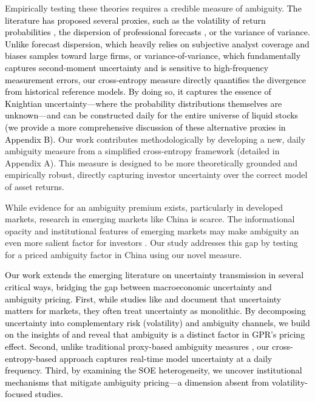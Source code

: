 \documentclass[preprint,12pt,authoryear]{elsarticle}
\begin{document}
Empirically testing these theories requires a credible measure of ambiguity. \textcolor{black}{The literature has proposed several proxies, such as the volatility of return probabilities \citep{Brenner2018}, the dispersion of professional forecasts \citep{Ulrich2013}, or the variance of variance.} \textcolor{black}{Unlike forecast dispersion, which heavily relies on subjective analyst coverage and biases samples toward large firms, or variance-of-variance, which fundamentally captures second-moment uncertainty and is sensitive to high-frequency measurement errors, our cross-entropy measure directly quantifies the divergence from historical reference models. By doing so, it captures the essence of Knightian uncertainty---where the probability distributions themselves are unknown---and can be constructed daily for the entire universe of liquid stocks (we provide a more comprehensive discussion of these alternative proxies in Appendix B).} Our work contributes methodologically by developing a new, daily ambiguity measure from a simplified cross-entropy framework (detailed in Appendix A). This measure is designed to be more theoretically grounded and empirically robust, directly capturing investor uncertainty over the correct model of asset returns.

While evidence for an ambiguity premium exists, particularly in developed markets, research in emerging markets like China is scarce. The informational opacity and institutional features of emerging markets may make ambiguity an even more salient factor for investors \citep{Easley2009}. Our study addresses this gap by testing for a priced ambiguity factor in China using our novel measure.

\textcolor{black}{Our work extends the emerging literature on uncertainty transmission in several critical ways, bridging the gap between macroeconomic uncertainty and ambiguity pricing. First, while studies like \citet{Baker2016} and \citet{Caldara2022} document that uncertainty matters for markets, they often treat uncertainty as monolithic. By decomposing uncertainty into complementary risk (volatility) and ambiguity channels, we build on the insights of \citet{Brenner2018} and reveal that ambiguity is a distinct factor in GPR's pricing effect.} \textcolor{black}{Second, unlike traditional proxy-based ambiguity measures \citep{Brenner2018}, our cross-entropy-based approach captures real-time model uncertainty at a daily frequency. Third, by examining the SOE heterogeneity, we uncover institutional mechanisms that mitigate ambiguity pricing---a dimension absent from volatility-focused studies.}
\end{document}
